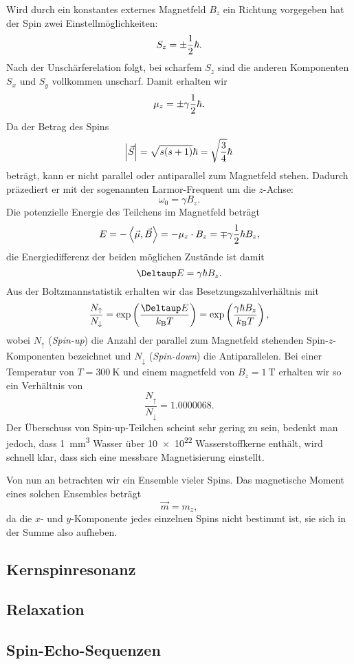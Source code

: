 \documentclass[
    11pt,
    ngerman
]{scrreprt}
\begin{document}
Wird durch ein konstantes externes Magnetfeld $B_z$ ein Richtung vorgegeben hat
der Spin zwei Einstellmöglichkeiten:
\[
    S_z = \pm\frac 12\hbar.
\]
Nach der Unschärferelation folgt, bei scharfem $S_z$ sind die anderen
Komponenten $S_x$ und $S_y$ vollkommen unscharf. Damit erhalten wir
\[
    \mu_z = \pm\gamma\frac 12\hbar.
\]
Da der Betrag des Spins 
\[
    \abs{\vec S} = \sqrt{s(s+1)}\hbar = \sqrt{\frac34}\hbar
\]
beträgt, kann er nicht parallel oder antiparallel zum Magnetfeld stehen.
Dadurch präzediert er mit der sogenannten Larmor-Frequent um die $z$-Achse:
\[
    \omega_0 = \gamma B_z.
\]
Die potenzielle Energie des Teilchens im Magnetfeld beträgt
\[
    E = -\left\langle\vec\mu,\vec B\right\rangle = -\mu_z \cdot B_z = \mp\gamma\frac 12\hbar B_z,
\]
die Energiedifferenz der beiden möglichen Zustände ist damit
\[
    \Deltaup E = \gamma\hbar B_z.
\]
Aus der Boltzmannstatistik erhalten wir das Besetzungszahlverhältnis mit
\[
    \frac{N_\uparrow}{N_\downarrow} = \dexp{\frac{\Deltaup E}{k_\text{B}T}} =
    \dexp{\frac{\gamma\hbar B_z}{k_\text{B}T}},
\]
wobei $N_\uparrow$ (\emph{Spin-up}) die Anzahl der parallel zum Magnetfeld
stehenden Spin-$z$-Komponenten bezeichnet und $N_\downarrow$ (\emph{Spin-down})
die Antiparallelen. Bei einer Temperatur von $T = \SI{300}{\kelvin}$ und einem
magnetfeld von $B_z = \SI{1}{\tesla}$ erhalten wir so ein Verhältnis von
\[
    \frac{N_\uparrow}{N_\downarrow} = \num{1.0000068}.
\]
Der Überschuss von Spin-up-Teilchen scheint sehr gering zu sein, bedenkt man
jedoch, dass \SI{1}{\milli\meter\cubed} Wasser über \num{10e22} Wasserstoffkerne
enthält, wird schnell klar, dass sich eine messbare Magnetisierung einstellt.

Von nun an betrachten wir ein Ensemble vieler Spins. Das magnetische Moment eines solchen Ensembles beträgt
\[
    \vec m = m_z,
\]
da die $x$- und $y$-Komponente jedes einzelnen Spins nicht bestimmt ist, sie
sich in der Summe also aufheben.

\subsection{Kernspinresonanz}

\subsection{Relaxation}

\subsection{Spin-Echo-Sequenzen}
\end{document}
